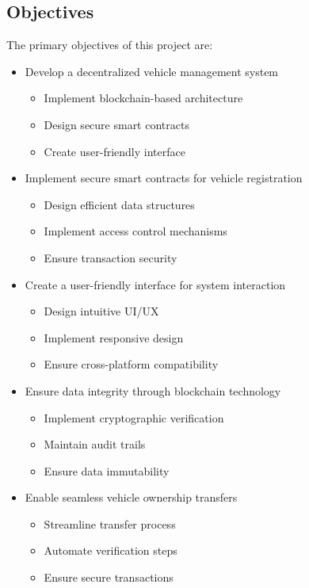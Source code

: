 \documentclass[12pt,a4paper]{article}
\begin{document}
    \subsection{Objectives}
    The primary objectives of this project are:

    \begin{itemize}
        \item Develop a decentralized vehicle management system
        \begin{itemize}
            \item Implement blockchain-based architecture
            \item Design secure smart contracts
            \item Create user-friendly interface
        \end{itemize}

        \item Implement secure smart contracts for vehicle registration
        \begin{itemize}
            \item Design efficient data structures
            \item Implement access control mechanisms
            \item Ensure transaction security
        \end{itemize}

        \item Create a user-friendly interface for system interaction
        \begin{itemize}
            \item Design intuitive UI/UX
            \item Implement responsive design
            \item Ensure cross-platform compatibility
        \end{itemize}

        \item Ensure data integrity through blockchain technology
        \begin{itemize}
            \item Implement cryptographic verification
            \item Maintain audit trails
            \item Ensure data immutability
        \end{itemize}

        \item Enable seamless vehicle ownership transfers
        \begin{itemize}
            \item Streamline transfer process
            \item Automate verification steps
            \item Ensure secure transactions
        \end{itemize}
    \end{itemize}
\end{document}
